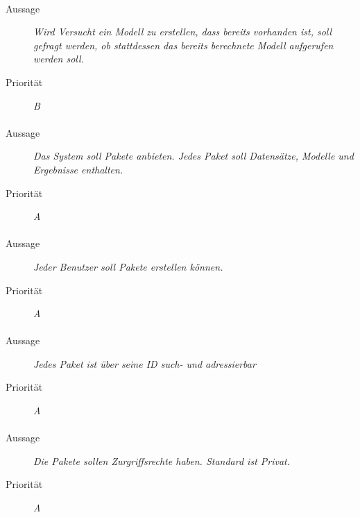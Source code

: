 \paragraph{}
\begin{description}
\item[Aussage] \textit{Wird Versucht ein Modell zu erstellen, dass bereits vorhanden ist, soll gefragt werden, ob stattdessen das bereits berechnete Modell aufgerufen werden soll.}
\item[Priorität] \textit{B}
\end{description}

\paragraph{}
\begin{description}
\item [Aussage] \textit{Das System soll Pakete anbieten. Jedes Paket soll Datensätze, Modelle und Ergebnisse enthalten.}
\item [Priorität] \textit{A}
\end{description}

\paragraph{}
\begin{description}
\item[Aussage] \textit{Jeder Benutzer soll Pakete erstellen können.}
\item[Priorität] \textit{A}
\end{description}

\paragraph{}
\begin{description}
\item[Aussage] \textit{Jedes Paket ist über seine ID such- und adressierbar}
\item[Priorität] \textit{A}
\end{description}

\paragraph{}
\begin{description}
\item[Aussage] \textit{Die Pakete sollen Zurgriffsrechte haben. Standard ist Privat.}
\item[Priorität] \textit{A}
\end{description}

